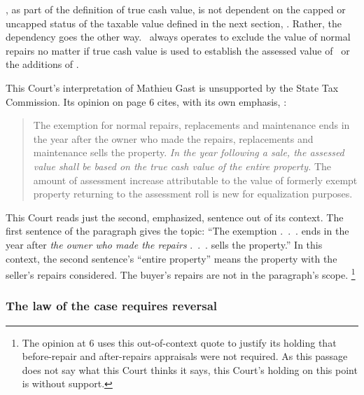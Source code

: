 \documentclass[12pt,\documentclassflag]{michiganCourtOfAppealsBrief}
\begin{document}

\mathieuGast, as part of the definition of true cash value, is not dependent on the capped or uncapped status of the taxable value defined in the next section, \cite{MCL 211.27a}. Rather, the dependency goes the other way. \mathieuGast\ always
operates to exclude the value of normal repairs no matter if true cash value is used to establish the assessed value of \cite{MCL 211.27a(1)}\ or the additions of \cite{MCL 211.27a(2)(b)}.

This Court's interpretation of Mathieu Gast is unsupported by the State Tax Commission. Its opinion on page 6 cites, with its own emphasis, :

\begin{quote}
The exemption for normal repairs, replacements and maintenance ends in the year after the
owner who made the repairs, replacements and maintenance sells the property. \emph{In the year
following a sale, the assessed value shall be based on the true cash value of the entire property.}
The amount of assessment increase attributable to the value of formerly exempt property
returning to the assessment roll is new for equalization purposes.
\end{quote}

This Court reads just the second, emphasized, sentence out of its context. The first sentence of the paragraph gives the topic: ``The exemption .~.~. ends in the year after \emph{the owner who made the repairs} .~.~. sells the property.'' In this context, the second sentence's ``entire property'' means the property with the seller's repairs considered.
The buyer's repairs are not in the paragraph's scope.%
\footnote{The opinion at 6 uses this out-of-context quote to justify its holding that before-repair and after-repairs appraisals were not required. As this passage does not say what this Court thinks it says, this Court's holding on this point is without support.}

\subsubsection{The law of the case requires reversal}
\end{document}

